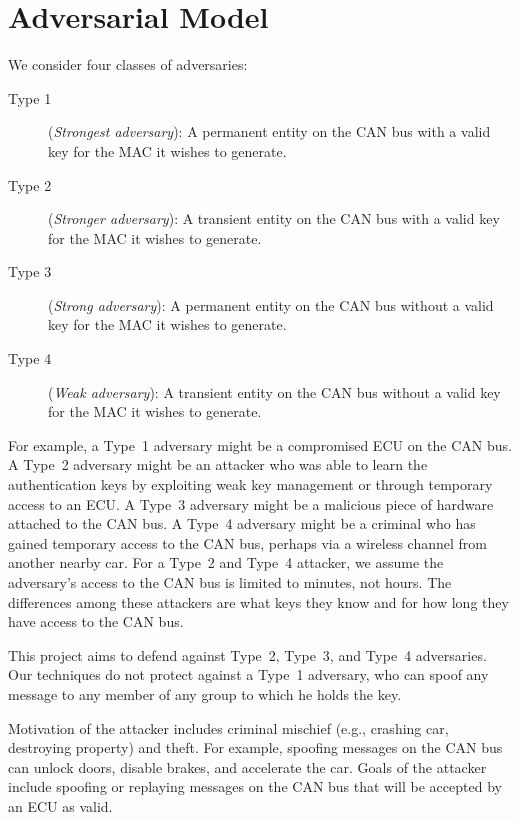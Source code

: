 \section{Adversarial Model}
\label{adversary}

We consider four classes of adversaries:

\begin{description}

	\item [Type 1]
	(\textit{Strongest adversary}): A permanent entity on the CAN bus with a valid key for the MAC it wishes to generate.
	
	\item [Type 2]
	(\textit{Stronger adversary}): A transient entity on the CAN bus with a valid key for the MAC it wishes to generate.
	
	\item [Type 3]
	(\textit{Strong adversary}): A permanent entity on the CAN bus without a valid key for the MAC it wishes to generate.
	
	\item [Type 4]
	(\textit{Weak adversary}): A transient entity on the CAN bus without a valid key for the MAC it wishes to generate.
	
\end{description}

For example, a Type~1 adversary might be a compromised ECU on the CAN bus.  
A Type~2 adversary might be an attacker who was able to learn the authentication keys by
exploiting weak key management or through temporary access to an ECU.
A Type~3 adversary might be a malicious piece of hardware attached
to the CAN bus.  
A Type~4 adversary might be a criminal who has gained temporary access to the CAN bus, perhaps via a wireless channel from
another nearby car.  For a Type~2 and Type~4 attacker, we assume the adversary's access to the CAN bus is limited to minutes, not hours.  
The differences among these attackers are what keys they know and for how long they have access to the CAN bus.

This project aims to defend against Type~2, Type~3, and Type~4 adversaries.   Our techniques do not protect against 
a Type~1 adversary, who can spoof any message to any member of any group to which he holds the key. 

Motivation of the attacker includes criminal mischief (e.g., crashing car, destroying property) and theft.  
For example, spoofing messages on the CAN bus can unlock doors, disable brakes, and accelerate the car.
Goals of the attacker include spoofing or replaying messages on the CAN bus that will be accepted by an ECU
as valid.

